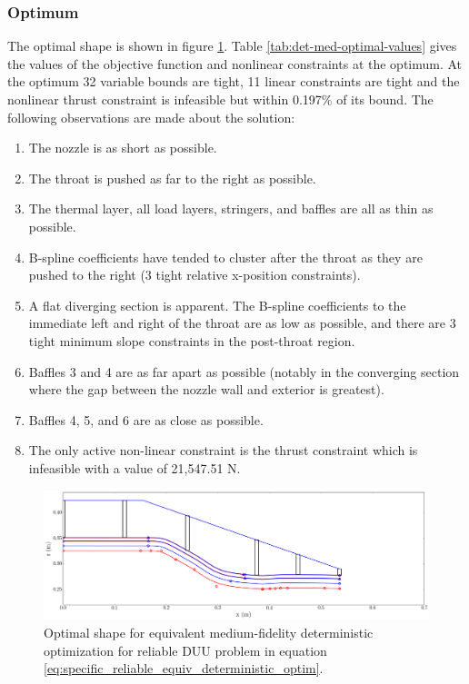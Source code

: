 \documentclass{article}
\begin{document}
\subsubsection{Optimum}

The optimal shape is shown in figure \ref{fig:det-med-optimal-shape}. Table \ref{tab:det-med-optimal-values} gives the values of the objective function and nonlinear constraints at the optimum. At the optimum 32 variable bounds are tight, 11 linear constraints are tight and the nonlinear thrust constraint is infeasible but within 0.197\% of its bound. The following observations are made about the solution:

\begin{enumerate}
\item The nozzle is as short as possible.
\item The throat is pushed as far to the right as possible.
\item The thermal layer, all load layers, stringers, and baffles are all as thin as possible.
\item B-spline coefficients have tended to cluster after the throat as they are pushed to the right (3 tight relative x-position constraints).
\item A flat diverging section is apparent. The B-spline coefficients to the immediate left and right of the throat are as low as possible, and there are 3 tight minimum slope constraints in the post-throat region.
\item Baffles 3 and 4 are as far apart as possible (notably in the converging section where the gap between the nozzle wall and exterior is greatest).
\item Baffles 4, 5, and 6 are as close as possible.
\item The only active non-linear constraint is the thrust constraint which is infeasible with a value of 21,547.51 N.
\end{enumerate}

\begin{figure}
\caption{Optimal shape for equivalent medium-fidelity deterministic optimization for reliable DUU problem in equation \ref{eq:specific_reliable_equiv_deterministic_optim}.}
\label{fig:det-med-optimal-shape}
\begin{center}
\includegraphics[scale=0.35]{figs/det-med-optimal-shape.png}
\end{center}
\end{figure}
\end{document}
